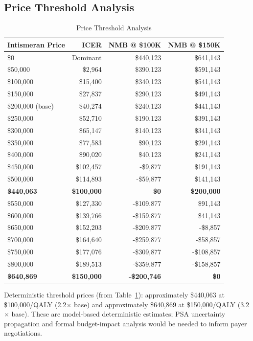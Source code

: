 \documentclass[11pt,a4paper]{article}
\begin{document}
\subsection{Price Threshold Analysis}
\label{sec:price_threshold}
\begin{table}[H]
\centering
\caption{Price Threshold Analysis}
\label{tab:s14}
\begin{tabular}{lrrr}
\toprule
\textbf{Intismeran Price} & \textbf{ICER} & \textbf{NMB @ \$100K} & \textbf{NMB @ \$150K} \\
\midrule
\$0 & Dominant & \$440,123 & \$641,143 \\
\$50,000 & \$2,964 & \$390,123 & \$591,143 \\
\$100,000 & \$15,400 & \$340,123 & \$541,143 \\
\$150,000 & \$27,837 & \$290,123 & \$491,143 \\
\$200,000 (base) & \$40,274 & \$240,123 & \$441,143 \\
\$250,000 & \$52,710 & \$190,123 & \$391,143 \\
\$300,000 & \$65,147 & \$140,123 & \$341,143 \\
\$350,000 & \$77,583 & \$90,123 & \$291,143 \\
\$400,000 & \$90,020 & \$40,123 & \$241,143 \\
\$450,000 & \$102,457 & -\$9,877 & \$191,143 \\
\$500,000 & \$114,893 & -\$59,877 & \$141,143 \\
\textbf{\$440,063} & \textbf{\$100,000} & \textbf{\$0} & \textbf{\$200,000} \\
\$550,000 & \$127,330 & -\$109,877 & \$91,143 \\
\$600,000 & \$139,766 & -\$159,877 & \$41,143 \\
\$650,000 & \$152,203 & -\$209,877 & -\$8,857 \\
\$700,000 & \$164,640 & -\$259,877 & -\$58,857 \\
\$750,000 & \$177,076 & -\$309,877 & -\$108,857 \\
\$800,000 & \$189,513 & -\$359,877 & -\$158,857 \\
\textbf{\$640,869} & \textbf{\$150,000} & \textbf{-\$200,746} & \textbf{\$0} \\
\end{tabular}
\end{table}
\noindent Deterministic threshold prices (from Table~\ref{tab:s14}): approximately \$440,063 at \$100,000/QALY (2.2$\times$ base) and approximately \$640,869 at \$150,000/QALY (3.2$\times$ base). These are model-based deterministic estimates; PSA uncertainty propagation and formal budget-impact analysis would be needed to inform payer negotiations.
\end{document}
